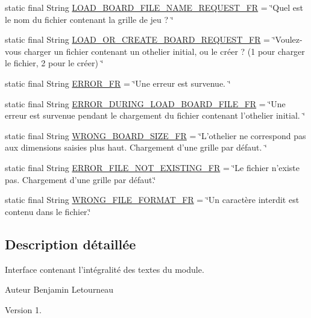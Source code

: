 \begin{DoxyCompactItemize}
static final String \hyperlink{interfacecom_1_1publisher_1_1utils_1_1PostsPublisher_a87515cd365fb9ad971ebf59a594d58cf}{L\-O\-A\-D\-\_\-\-B\-O\-A\-R\-D\-\_\-\-F\-I\-L\-E\-\_\-\-N\-A\-M\-E\-\_\-\-R\-E\-Q\-U\-E\-S\-T\-\_\-\-F\-R} = \char`\"{}Quel est le nom du fichier contenant la grille de jeu ? \char`\"{}
\item 
static final String \hyperlink{interfacecom_1_1publisher_1_1utils_1_1PostsPublisher_a7e36fc896457c57287f9ef716e84001a}{L\-O\-A\-D\-\_\-\-O\-R\-\_\-\-C\-R\-E\-A\-T\-E\-\_\-\-B\-O\-A\-R\-D\-\_\-\-R\-E\-Q\-U\-E\-S\-T\-\_\-\-F\-R} = \char`\"{}Voulez-\/vous charger un fichier contenant un othelier initial, ou le créer ? (1 pour charger le fichier, 2 pour le créer) \char`\"{}
\item 
static final String \hyperlink{interfacecom_1_1publisher_1_1utils_1_1PostsPublisher_a3cb50da369d4eb6b0a062bea57ac917e}{E\-R\-R\-O\-R\-\_\-\-F\-R} = \char`\"{}Une erreur est survenue. \char`\"{}
\item 
static final String \hyperlink{interfacecom_1_1publisher_1_1utils_1_1PostsPublisher_ae9725f99ac0440b88e747722dc3e6e61}{E\-R\-R\-O\-R\-\_\-\-D\-U\-R\-I\-N\-G\-\_\-\-L\-O\-A\-D\-\_\-\-B\-O\-A\-R\-D\-\_\-\-F\-I\-L\-E\-\_\-\-F\-R} = \char`\"{}Une erreur est survenue pendant le chargement du fichier contenant l'othelier initial. \char`\"{}
\item 
static final String \hyperlink{interfacecom_1_1publisher_1_1utils_1_1PostsPublisher_a08e37250846360cc0ca5db46e0be6d3c}{W\-R\-O\-N\-G\-\_\-\-B\-O\-A\-R\-D\-\_\-\-S\-I\-Z\-E\-\_\-\-F\-R} = \char`\"{}L'othelier ne correspond pas aux dimensions saisies plus haut. Chargement d'une grille par défaut. \char`\"{}
\item 
static final String \hyperlink{interfacecom_1_1publisher_1_1utils_1_1PostsPublisher_a2aff0928bfa85847bdd4ed7d6e5342e2}{E\-R\-R\-O\-R\-\_\-\-F\-I\-L\-E\-\_\-\-N\-O\-T\-\_\-\-E\-X\-I\-S\-T\-I\-N\-G\-\_\-\-F\-R} = \char`\"{}Le fichier n'existe pas. Chargement d'une grille par défaut.\char`\"{}
\item 
static final String \hyperlink{interfacecom_1_1publisher_1_1utils_1_1PostsPublisher_a313ff71a9df92d5bcfa51b03c0c53248}{W\-R\-O\-N\-G\-\_\-\-F\-I\-L\-E\-\_\-\-F\-O\-R\-M\-A\-T\-\_\-\-F\-R} = \char`\"{}Un caractère interdit est contenu dans le fichier.\char`\"{}
\end{DoxyCompactItemize}


\subsection{Description détaillée}
Interface contenant l'intégralité des textes du module. \begin{DoxyAuthor}{Auteur}
Benjamin Letourneau 
\end{DoxyAuthor}
\begin{DoxyVersion}{Version}
1. 
\end{DoxyVersion}


